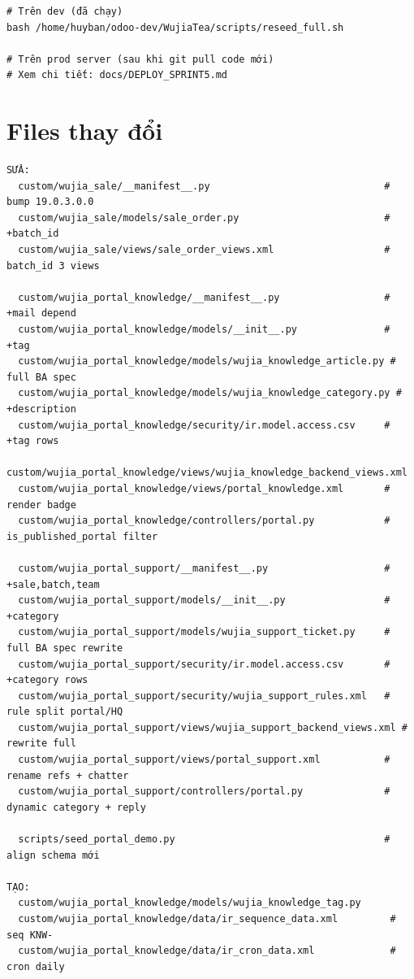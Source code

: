 \begin{lstlisting}[style=shell]
# Trên dev (đã chạy)
bash /home/huyban/odoo-dev/WujiaTea/scripts/reseed_full.sh

# Trên prod server (sau khi git pull code mới)
# Xem chi tiết: docs/DEPLOY_SPRINT5.md
\end{lstlisting}

\section{Files thay đổi}

\begin{lstlisting}[style=shell]
SỬA:
  custom/wujia_sale/__manifest__.py                              # bump 19.0.3.0.0
  custom/wujia_sale/models/sale_order.py                         # +batch_id
  custom/wujia_sale/views/sale_order_views.xml                   # batch_id 3 views

  custom/wujia_portal_knowledge/__manifest__.py                  # +mail depend
  custom/wujia_portal_knowledge/models/__init__.py               # +tag
  custom/wujia_portal_knowledge/models/wujia_knowledge_article.py # full BA spec
  custom/wujia_portal_knowledge/models/wujia_knowledge_category.py # +description
  custom/wujia_portal_knowledge/security/ir.model.access.csv     # +tag rows
  custom/wujia_portal_knowledge/views/wujia_knowledge_backend_views.xml
  custom/wujia_portal_knowledge/views/portal_knowledge.xml       # render badge
  custom/wujia_portal_knowledge/controllers/portal.py            # is_published_portal filter

  custom/wujia_portal_support/__manifest__.py                    # +sale,batch,team
  custom/wujia_portal_support/models/__init__.py                 # +category
  custom/wujia_portal_support/models/wujia_support_ticket.py     # full BA spec rewrite
  custom/wujia_portal_support/security/ir.model.access.csv       # +category rows
  custom/wujia_portal_support/security/wujia_support_rules.xml   # rule split portal/HQ
  custom/wujia_portal_support/views/wujia_support_backend_views.xml # rewrite full
  custom/wujia_portal_support/views/portal_support.xml           # rename refs + chatter
  custom/wujia_portal_support/controllers/portal.py              # dynamic category + reply

  scripts/seed_portal_demo.py                                    # align schema mới

TẠO:
  custom/wujia_portal_knowledge/models/wujia_knowledge_tag.py
  custom/wujia_portal_knowledge/data/ir_sequence_data.xml         # seq KNW-
  custom/wujia_portal_knowledge/data/ir_cron_data.xml             # cron daily


\end{lstlisting}
